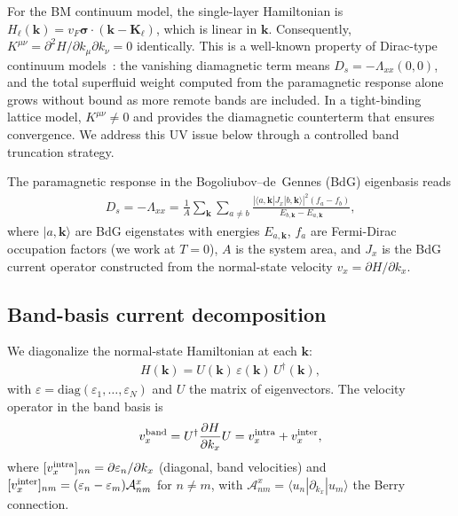 \documentclass[prb,twocolumn,superscriptaddress,floatfix]{revtex4-2}
\begin{document}
For the BM continuum model, the single-layer Hamiltonian is $H_\ell(\mathbf{k}) = v_F \bm{\sigma} \cdot (\mathbf{k} - \mathbf{K}_\ell)$, which is linear in $\mathbf{k}$.
Consequently, $K^{\mu\nu} = \partial^2 H / \partial k_\mu \partial k_\nu = 0$ identically.
This is a well-known property of Dirac-type continuum models~\cite{kopnin_2008}: the vanishing diamagnetic term means $D_s = -\Lambda_{xx}(0,0)$, and the total superfluid weight computed from the paramagnetic response alone grows without bound as more remote bands are included.
In a tight-binding lattice model, $K^{\mu\nu} \neq 0$ and provides the diamagnetic counterterm that ensures convergence.
We address this UV issue below through a controlled band truncation strategy.

The paramagnetic response in the Bogoliubov--de~Gennes (BdG) eigenbasis reads
\begin{align}
D_s = -\Lambda_{xx} = \frac{1}{A}\sum_{\mathbf{k}}\sum_{a \neq b} \frac{|\langle a,\mathbf{k}|J_x|b,\mathbf{k}\rangle|^2 (f_a - f_b)}{E_{b,\mathbf{k}} - E_{a,\mathbf{k}}},
\label{eq:kubo}
\end{align}
where $|a,\mathbf{k}\rangle$ are BdG eigenstates with energies $E_{a,\mathbf{k}}$, $f_a$ are Fermi-Dirac occupation factors (we work at $T=0$), $A$ is the system area, and $J_x$ is the BdG current operator constructed from the normal-state velocity $v_x = \partial H / \partial k_x$.

\subsection{Band-basis current decomposition}

We diagonalize the normal-state Hamiltonian at each $\mathbf{k}$:
\begin{align}
H(\mathbf{k}) = U(\mathbf{k})\,\varepsilon(\mathbf{k})\,U^\dagger(\mathbf{k}),
\end{align}
with $\varepsilon = \mathrm{diag}(\varepsilon_1, \ldots, \varepsilon_N)$ and $U$ the matrix of eigenvectors.
The velocity operator in the band basis is
\begin{align}
v_x^{\rm band} = U^\dagger \frac{\partial H}{\partial k_x} U = v_x^{\rm intra} + v_x^{\rm inter},
\end{align}
where $[v_x^{\rm intra}]_{nn} = \partial \varepsilon_n / \partial k_x$ (diagonal, band velocities) and $[v_x^{\rm inter}]_{nm} = (\varepsilon_n - \varepsilon_m)\mathcal{A}_{nm}^x$ for $n \neq m$, with $\mathcal{A}_{nm}^x = \langle u_n | \partial_{k_x} | u_m \rangle$ the Berry connection.
\end{document}
